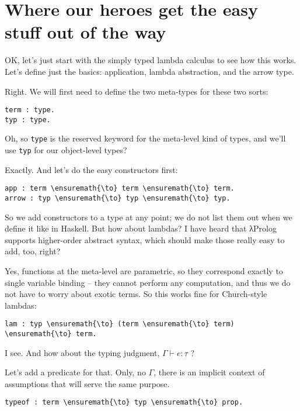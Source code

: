 \section{Where our heroes get the easy stuff out of the
way}\label{where-our-heroes-get-the-easy-stuff-out-of-the-way}

\heroSTUDENT{} OK, let's just start with the simply typed lambda calculus to
see how this works. Let's define just the basics: application, lambda
abstraction, and the arrow type.

\heroADVISOR{} Right. We will first need to define the two meta-types for
these two sorts:

\begin{verbatim}
term : type.
typ : type.
\end{verbatim}

\heroSTUDENT{} Oh, so \texttt{type} is the reserved keyword for the meta-level
kind of types, and we'll use \texttt{typ} for our object-level types?

\heroADVISOR{} Exactly. And let's do the easy constructors first:

\begin{verbatim}
app : term \ensuremath{\to} term \ensuremath{\to} term.
arrow : typ \ensuremath{\to} typ \ensuremath{\to} typ.
\end{verbatim}

\heroSTUDENT{} So we add constructors to a type at any point; we do not list
them out when we define it like in Haskell. But how about lambdas? I
have heard that \foreignlanguage{greek}{λ}Prolog supports higher-order abstract syntax, which
should make those really easy to add, too, right?

\heroADVISOR{} Yes, functions at the meta-level are parametric, so they
correspond exactly to single variable binding -- they cannot perform any
computation, and thus we do not have to worry about exotic terms. So
this works fine for Church-style lambdas:

\begin{verbatim}
lam : typ \ensuremath{\to} (term \ensuremath{\to} term) \ensuremath{\to} term.
\end{verbatim}

\heroSTUDENT{} I see. And how about the typing judgment,
\(\Gamma \vdash e : \tau\) ?

\heroADVISOR{} Let's add a predicate for that. Only, no \(\Gamma\), there is
an implicit context of assumptions that will serve the same purpose.

\begin{verbatim}
typeof : term \ensuremath{\to} typ \ensuremath{\to} prop.
\end{verbatim}

